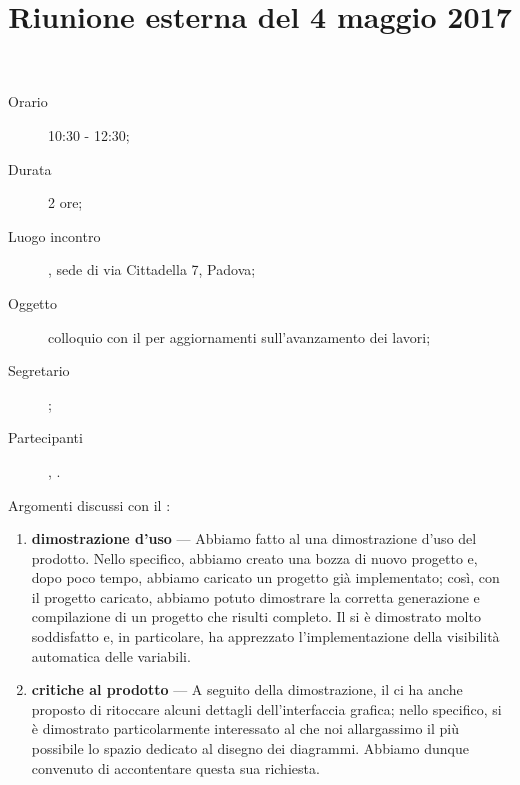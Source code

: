 


\author{\LS}
\supervisor{\AZ}
\title{Riunione esterna del 4 maggio 2017}



\maketitle

\begin{description}
	\item[Orario] 10:30 - 12:30;
	\item[Durata] 2 ore;
	\item[Luogo incontro] \ZU, sede di via Cittadella 7, Padova;
	\item[Oggetto] colloquio con il \GP{} per aggiornamenti sull'avanzamento dei lavori;
	\item[Segretario] \LB; 
	\item[Partecipanti] \GP, \ALL.
\end{description}

Argomenti discussi con il \GP:
\begin{enumerate}
	\item \textbf{dimostrazione d'uso} --- Abbiamo fatto al \GP{} una dimostrazione d'uso del prodotto. Nello specifico, abbiamo creato una bozza di nuovo progetto e, dopo poco tempo, abbiamo caricato un progetto già implementato; così, con il progetto caricato, abbiamo potuto dimostrare la corretta generazione e compilazione di un progetto che risulti completo. Il \GP{} si è dimostrato molto soddisfatto e, in particolare, ha apprezzato l'implementazione della visibilità automatica delle variabili.
	\item \textbf{critiche al prodotto} --- A seguito della dimostrazione, il \GP{} ci ha anche proposto di ritoccare alcuni dettagli dell'interfaccia grafica; nello specifico, si è dimostrato particolarmente interessato al che noi allargassimo il più possibile lo spazio dedicato al disegno dei diagrammi. Abbiamo dunque convenuto di accontentare questa sua richiesta.
\end{enumerate}


